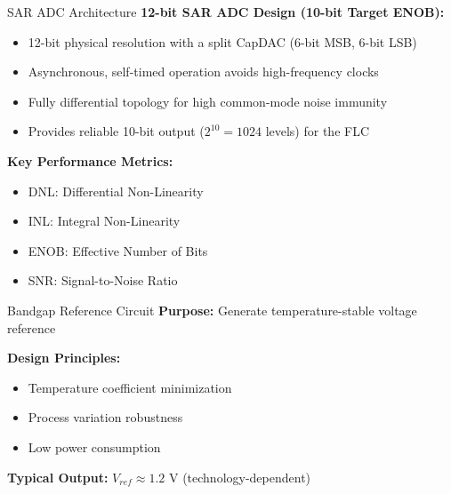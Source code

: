 \documentclass[aspectratio=169,usenames,dvipsnames]{beamer}
\begin{document}
\begin{frame}{SAR ADC Architecture}
    \textbf{12-bit SAR ADC Design (10-bit Target ENOB):}
    \begin{itemize}
        \item 12-bit physical resolution with a split CapDAC (6-bit MSB, 6-bit LSB)
        \item Asynchronous, self-timed operation avoids high-frequency clocks
        \item Fully differential topology for high common-mode noise immunity
        \item Provides reliable 10-bit output ($2^{10} = 1024$ levels) for the FLC
    \end{itemize}
    
    \vspace{0.3cm}
    \textbf{Key Performance Metrics:}
    \begin{itemize}
        \item DNL: Differential Non-Linearity
        \item INL: Integral Non-Linearity
        \item ENOB: Effective Number of Bits
        \item SNR: Signal-to-Noise Ratio
    \end{itemize}
\end{frame}

\begin{frame}{Bandgap Reference Circuit}
    \textbf{Purpose:} Generate temperature-stable voltage reference
    
    \vspace{0.2cm}
    \textbf{Design Principles:}
    \begin{itemize}
        \item Temperature coefficient minimization
        \item Process variation robustness
        \item Low power consumption
    \end{itemize}
    
    \vspace{0.3cm}
    \textbf{Typical Output:} $V_{ref} \approx 1.2$ V (technology-dependent)
\end{frame}
\end{document}
